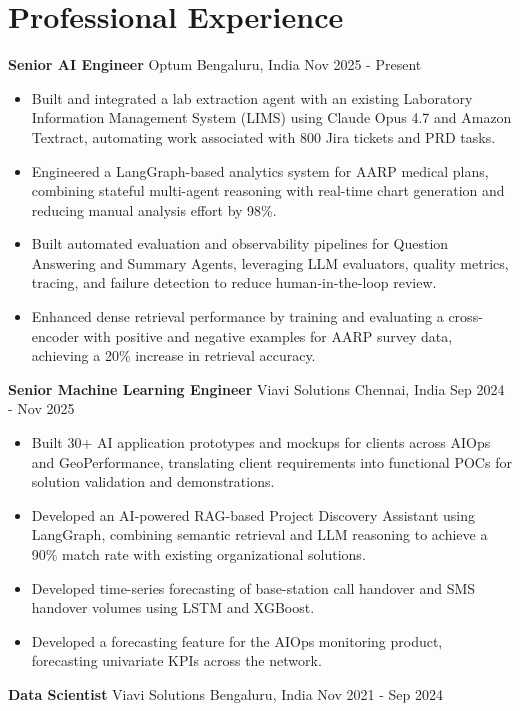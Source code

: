\documentclass[10pt,a4paper]{article}
\newcommand{\role}[4]{\textbf{#1} \textbar{} #2 \hfill #3 \textbar{} #4\par}
\begin{document}
\section{Professional Experience}
\role{Senior AI Engineer}{Optum}{Bengaluru, India}{Nov 2025 - Present}
\begin{itemize}
  \item Built and integrated a lab extraction agent with an existing Laboratory Information Management System (LIMS) using Claude Opus 4.7 and Amazon Textract, automating work associated with 800 Jira tickets and PRD tasks.
  \item Engineered a LangGraph-based analytics system for AARP medical plans, combining stateful multi-agent reasoning with real-time chart generation and reducing manual analysis effort by 98\%.
  \item Built automated evaluation and observability pipelines for Question Answering and Summary Agents, leveraging LLM evaluators, quality metrics, tracing, and failure detection to reduce human-in-the-loop review.
  \item Enhanced dense retrieval performance by training and evaluating a cross-encoder with positive and negative examples for AARP survey data, achieving a 20\% increase in retrieval accuracy.
\end{itemize}
\vspace{3pt}
\role{Senior Machine Learning Engineer}{Viavi Solutions}{Chennai, India}{Sep 2024 - Nov 2025}
\begin{itemize}
  \item Built 30+ AI application prototypes and mockups for clients across AIOps and GeoPerformance, translating client requirements into functional POCs for solution validation and demonstrations.
  \item Developed an AI-powered RAG-based Project Discovery Assistant using LangGraph, combining semantic retrieval and LLM reasoning to achieve a 90\% match rate with existing organizational solutions.
  \item Developed time-series forecasting of base-station call handover and SMS handover volumes using LSTM and XGBoost.
  \item Developed a forecasting feature for the AIOps monitoring product, forecasting univariate KPIs across the network.
\end{itemize}
\vspace{3pt}
\role{Data Scientist}{Viavi Solutions}{Bengaluru, India}{Nov 2021 - Sep 2024}
\end{document}
